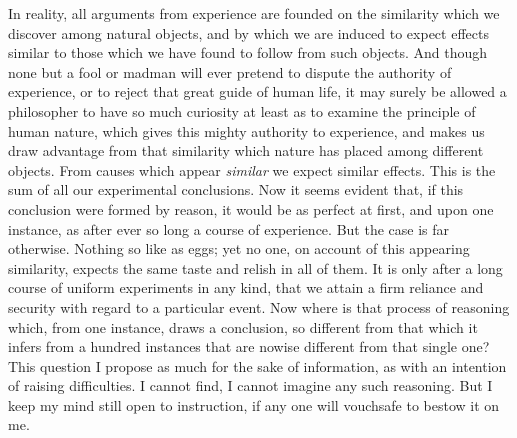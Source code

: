 \documentclass[]{article}
\begin{document}
\begin{sectionbody}
\humeparagraph  In reality, all arguments from experience are founded on the similarity which we discover among natural objects, and by which we are induced to expect effects similar to those which we have found to follow from such objects. And though none but a fool or madman will ever pretend to dispute the authority of experience, or to reject that great guide of human life, it may surely be allowed a philosopher to have so much curiosity at least as to examine the principle of human nature, which gives this mighty authority to experience, and makes us draw advantage from that similarity which nature has placed among different objects. From causes which appear \emph{similar} we expect similar effects. This is the sum of all our experimental conclusions. Now it seems evident that, if this conclusion were formed by reason, it would be as perfect at first, and upon one instance, as after ever so long a course of experience. But the case is far otherwise. Nothing so like as eggs; yet no one, on account of this appearing similarity, expects the same taste and relish in all of them. It is only after a long course of uniform experiments in any kind, that we attain a firm reliance and security with regard to a particular event. Now where is that process of reasoning which, from one instance, draws a conclusion, so different from that which it infers from a hundred instances that are nowise different from that single one? This question I propose as much for the sake of information, as with an intention of raising difficulties. I cannot find, I cannot imagine any such reasoning. But I keep my mind still open to instruction, if any one will vouchsafe to bestow it on me.


\end{sectionbody}
\end{document}
